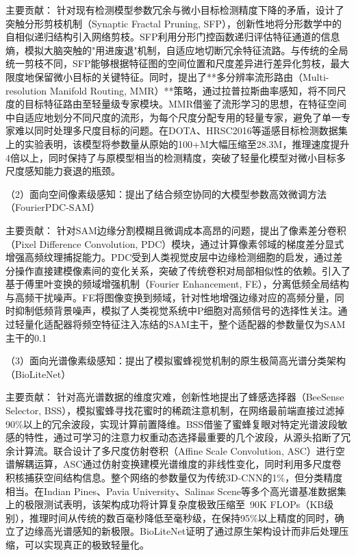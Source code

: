 主要贡献： 针对现有检测模型参数冗余与微小目标检测精度下降的矛盾，设计了突触分形剪枝机制（Synaptic Fractal Pruning, SFP），创新性地将分形数学中的自相似递归结构引入网络剪枝。SFP利用分形门控函数递归评估特征通道的信息熵，模拟大脑突触的"用进废退"机制，自适应地切断冗余特征流路。与传统的全局统一剪枝不同，SFP能够根据特征图的空间位置和尺度差异进行差异化剪枝，最大限度地保留微小目标的关键特征。同时，提出了**多分辨率流形路由（Multi-resolution Manifold Routing, MMR）**策略，通过拉普拉斯曲率感知，将不同尺度的目标特征路由至轻量级专家模块。MMR借鉴了流形学习的思想，在特征空间中自适应地划分不同尺度的流形，为每个尺度分配专用的轻量专家，避免了单一专家难以同时处理多尺度目标的问题。在DOTA、HRSC2016等遥感目标检测数据集上的实验表明，该模型将参数量从原始的100+M大幅压缩至28.3M，推理速度提升4倍以上，同时保持了与原模型相当的检测精度，突破了轻量化模型对微小目标多尺度感知能力衰退的瓶颈。

（2）面向空间像素级感知：提出了结合频空协同的大模型参数高效微调方法（FourierPDC-SAM）

主要贡献： 针对SAM边缘分割模糊且微调成本高昂的问题，提出了像素差分卷积（Pixel Difference Convolution, PDC）模块，通过计算像素邻域的梯度差分显式增强高频纹理捕捉能力。PDC受到人类视觉皮层中边缘检测细胞的启发，通过差分操作直接建模像素间的变化关系，突破了传统卷积对局部相似性的依赖。引入了基于傅里叶变换的频域增强机制（Fourier Enhancement, FE），分离低频全局结构与高频干扰噪声。FE将图像变换到频域，针对性地增强边缘对应的高频分量，同时抑制低频背景噪声，模拟了人类视觉系统中P细胞对高频信号的选择性关注。通过轻量化适配器将频空特征注入冻结的SAM主干，整个适配器的参数量仅为SAM主干的0.1%

（3）面向光谱像素级感知：提出了模拟蜜蜂视觉机制的原生极简高光谱分类架构（BioLiteNet）

主要贡献： 针对高光谱数据的维度灾难，创新性地提出了蜂感选择器（BeeSense Selector, BSS），模拟蜜蜂寻找花蜜时的稀疏注意机制，在网络最前端直接过滤掉90\%以上的冗余波段，实现计算前置降维。BSS借鉴了蜜蜂复眼对特定光谱波段敏感的特性，通过可学习的注意力权重动态选择最重要的几个波段，从源头掐断了冗余计算流。联合设计了多尺度仿射卷积（Affine Scale Convolution, ASC）进行空谱解耦运算，ASC通过仿射变换建模光谱维度的非线性变化，同时利用多尺度卷积核捕获空间结构信息。整个网络的参数量仅为传统3D-CNN的1\%，但分类精度相当。在Indian Pines、Pavia University、Salinas Scene等多个高光谱基准数据集上的极限测试表明，该架构成功将计算复杂度极致压缩至~90K FLOPs（KB级别），推理时间从传统的数百毫秒降低至毫秒级，在保持95\%以上精度的同时，确立了边缘高光谱感知的新极限。BioLiteNet证明了通过原生架构设计而非后处理压缩，可以实现真正的极致轻量化。

